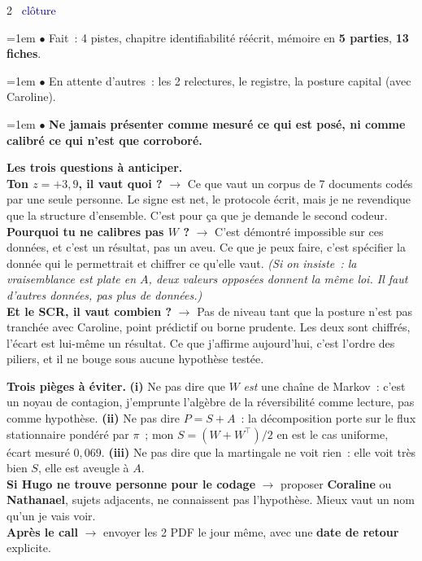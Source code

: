 \documentclass[10pt,a4paper]{article}
\newcommand{\slide}[2]{%
  \medskip\noindent{\color{navy}\bfseries #1.}\ \textcolor{navy}{\footnotesize #2}\par\nobreak\smallskip}
\newcommand{\dire}[1]{\noindent\hangindent=1em\hangafter=1 #1\par}
\newcommand{\n}[1]{\textbf{#1}}
\begin{document}
\begin{multicols}{2}
\slide{14. Points bloquants}{clôture}
\dire{$\bullet$ Fait~: 4 pistes, chapitre identifiabilité réécrit, mémoire en \n{5 parties}, \n{13 fiches}.}
\dire{$\bullet$ En attente d'autres~: les 2 relectures, le registre, la posture capital (avec Caroline).}
\dire{$\bullet$ \n{\og Ne jamais présenter comme mesuré ce qui est posé, ni comme calibré ce qui n'est que corroboré.\fg}}

\end{multicols}

\vspace{-4pt}
\begin{alerte}
\footnotesize
\textbf{Les trois questions à anticiper.}\\[3pt]
\textbf{\og Ton $z=+3{,}9$, il vaut quoi ?\fg} $\rightarrow$ Ce que vaut un corpus de 7 documents codés par une seule
personne. Le signe est net, le protocole écrit, mais je ne revendique que la structure d'ensemble. C'est pour ça
que je demande le second codeur.\\[3pt]
\textbf{\og Pourquoi tu ne calibres pas $W$ ?\fg} $\rightarrow$ C'est démontré impossible sur ces données, et c'est
un résultat, pas un aveu. Ce que je peux faire, c'est spécifier la donnée qui le permettrait et chiffrer ce qu'elle
vaut. \emph{(Si on insiste~: la vraisemblance est plate en $A$, deux valeurs opposées donnent la même loi. Il faut
d'autres données, pas plus de données.)}\\[3pt]
\textbf{\og Et le SCR, il vaut combien ?\fg} $\rightarrow$ Pas de niveau tant que la posture n'est pas tranchée avec
Caroline, point prédictif ou borne prudente. Les deux sont chiffrés, l'écart est lui-même un résultat. Ce que
j'affirme aujourd'hui, c'est l'ordre des piliers, et il ne bouge sous aucune hypothèse testée.
\end{alerte}

\vspace{2pt}
\begin{alerte}
\footnotesize
\textbf{Trois pièges à éviter.}
\textbf{(i)} Ne pas dire que $W$ \emph{est} une chaîne de Markov~: c'est un noyau de contagion, j'emprunte
l'algèbre de la réversibilité comme lecture, pas comme hypothèse.
\textbf{(ii)} Ne pas dire \og $P=S+A$\fg~: la décomposition porte sur le flux stationnaire pondéré par $\pi$~; mon
$S=(W+W^{\top})/2$ en est le cas uniforme, écart mesuré $0{,}069$.
\textbf{(iii)} Ne pas dire que la martingale \og ne voit rien\fg~: elle voit très bien $S$, elle est aveugle à $A$.\\[3pt]
\textbf{Si Hugo ne trouve personne pour le codage} $\rightarrow$ proposer \textbf{Coraline} ou \textbf{Nathanael},
sujets adjacents, ne connaissent pas l'hypothèse. Mieux vaut un nom qu'un \og je vais voir\fg.\\[3pt]
\textbf{Après le call} $\rightarrow$ envoyer les 2 PDF le jour même, avec une \textbf{date de retour} explicite.
\end{alerte}
\end{document}
